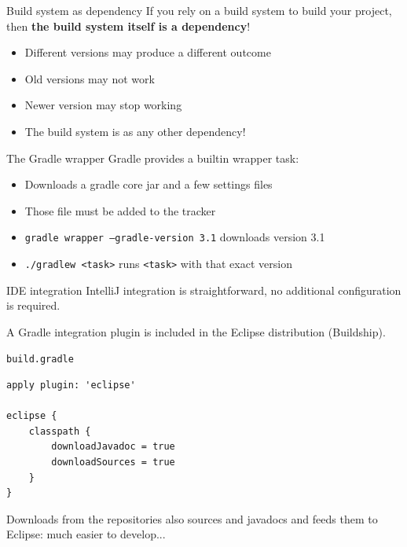 \documentclass[presentation]{beamer}
\begin{document}
\begin{frame}[fragile]{Build system as dependency}
	If you rely on a build system to build your project, then \textbf{the build system itself is a dependency}!
	\begin{itemize}
		\item Different versions may produce a different outcome
		\item Old versions may not work
		\item Newer version may stop working
		\item The build system is as any other dependency!
	\end{itemize}
	\begin{block}{The Gradle wrapper}
		Gradle provides a builtin wrapper task:
		\begin{itemize}
			\item Downloads a gradle core jar and a few settings files
			\item Those file must be added to the tracker
			\item \texttt{gradle wrapper --gradle-version 3.1} downloads version 3.1
			\item \texttt{./gradlew <task>} runs \texttt{<task>} with that exact version
		\end{itemize}
	\end{block}
\end{frame}

\begin{frame}[fragile]{IDE integration}
	IntelliJ integration is straightforward, no additional configuration is required.
	
	A Gradle integration plugin is included in the Eclipse distribution (Buildship).
	\begin{block}{\texttt{build.gradle}}
		\begin{verbatim}
apply plugin: 'eclipse'

eclipse {
    classpath {
        downloadJavadoc = true
        downloadSources = true
    }
}
		\end{verbatim}
	\end{block}
	Downloads from the repositories also sources and javadocs and feeds them to Eclipse: much easier to develop...
\end{frame}
\end{document}
